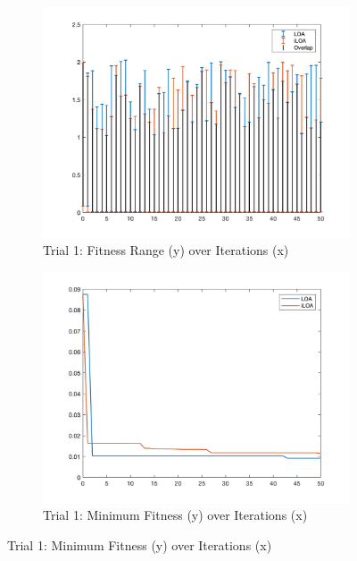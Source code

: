 \begin{figure}
  \centering
  \begin{subfigure}[b]{0.4\textwidth}
    \includegraphics[width=\textwidth]{img/bars/f5/1}
    \caption{ \scriptsize Trial 1: Fitness Range (y) over Iterations (x)}
    \label{fig:f5-b-1}
  \end{subfigure}
  \begin{subfigure}[b]{0.4\textwidth}
    \includegraphics[width=\textwidth]{img/fits/f5/1}
    \caption{ \scriptsize Trial 1: Minimum Fitness (y) over Iterations (x)}
    \label{fig:f5-f-1}
  \end{subfigure}


\end{figure}
